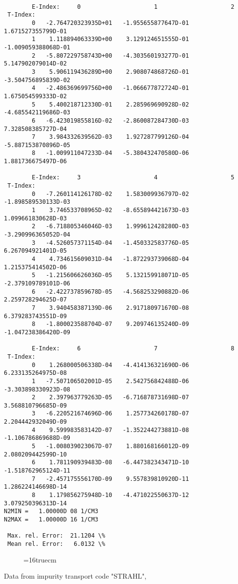 \documentclass[12pt,dvipdfmx]{article}
\begin{document}
\begin{small}\begin{verbatim}

        E-Index:     0                     1                     2
 T-Index:
        0   -2.764720323935D+01   -1.955655877647D-01    1.671527355799D-01
        1    1.118894063339D+00    3.129124651555D-01   -1.009059388068D-01
        2   -5.807229758743D+00   -4.303560193277D-01    5.147902079014D-02
        3    5.906119436289D+00    2.908074868726D-01   -3.504756895839D-02
        4   -2.486369699756D+00   -1.066677872724D-01    1.675054599333D-02
        5    5.400218712330D-01    2.285969690928D-02   -4.685542119686D-03
        6   -6.423019855816D-02   -2.860087284730D-03    7.328508385727D-04
        7    3.984332639562D-03    1.927287799126D-04   -5.887153870896D-05
        8   -1.009911047233D-04   -5.380432470580D-06    1.881736675497D-06

        E-Index:     3                     4                     5
 T-Index:
        0   -7.260114126178D-02    1.583009936797D-02   -1.898589530133D-03
        1    3.746533708965D-02   -8.655894421673D-03    1.099661830628D-03
        2   -6.718805346046D-03    1.999612428280D-03   -3.290996365052D-04
        3   -4.526057371154D-04   -1.450332583776D-05    6.267094921401D-05
        4    4.734615609031D-04   -1.872293739068D-04    1.215375414502D-06
        5   -1.215606626036D-05    5.132159918071D-05   -2.379109789101D-06
        6   -2.422737859678D-05   -4.568253290882D-06    2.259728294625D-07
        7    3.940458387139D-06    2.917180971670D-08    6.379283743551D-09
        8   -1.800023588704D-07    9.209746135240D-09   -1.047238386420D-09

        E-Index:     6                     7                     8
 T-Index:
        0    1.268000506338D-04   -4.414136321690D-06    6.233135264975D-08
        1   -7.507106502001D-05    2.542756842488D-06   -3.303898330923D-08
        2    2.397963779263D-05   -6.716878731698D-07    3.568810796685D-09
        3   -6.220521674696D-06    1.257734260178D-07    2.204442932049D-09
        4    9.599983583142D-07   -1.352244273881D-08   -1.106786869688D-09
        5   -1.008039023067D-07    1.880168166012D-09    2.080209442599D-10
        6    1.781190939483D-08   -6.447382343471D-10   -1.518762965124D-11
        7   -2.457175556170D-09    9.557839810920D-11    1.286224146698D-14
        8    1.179856275948D-10   -4.471022550637D-12    3.079250396313D-14
N2MIN =   1.00000D 08 1/CM3
N2MAX =   1.00000D 16 1/CM3

 Max. rel. Error:  21.1204 \%
 Mean rel. Error:   6.0132 \%

\end{verbatim}\end{small}
\begin{figure} \label{2.3.10B1}
\epsfxsize=16truecm
\end{figure}
\newpage
Data from impurity transport code "STRAHL", \cite{kn:Behringer}
\end{document}
